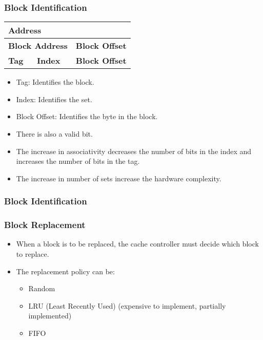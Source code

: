 \begin{frame}
    \frametitle{Block Identification}
    \begin{table}[h!]
        \centering
        \begin{tabular}{|p{5cm}|p{3cm}|p{3cm}|}
            \hline
            \multicolumn{3}{|p{11cm}|}{\textbf{Address}} \\
            \hline
            \multicolumn{2}{|p{8cm}|}{\textbf{Block Address}} & \multicolumn{1}{p{3cm}|}{\textbf{Block Offset}} \\
            \hline
            \multicolumn{1}{|p{5cm}|}{\textbf{Tag}} & \multicolumn{1}{|p{3cm}|}{\textbf{Index}} & \multicolumn{1}{p{3cm}|}{\textbf{Block Offset}} \\
            \hline
        \end{tabular}
    \end{table}
    \begin{itemize}
        \item Tag: Identifies the block.
        \item Index: Identifies the set.
        \item Block Offset: Identifies the byte in the block.
        \item There is also a valid bit.
        \item The increase in associativity decreases the number of bits in the index and increases the number of bits in the tag.
        \item The increase in number of sets increase the hardware complexity.
    \end{itemize}
\end{frame}


\begin{frame}
    \frametitle{Block Identification}
\end{frame}

\begin{frame}
    \frametitle{Block Replacement}
    \begin{itemize}
        \item When a block is to be replaced, the cache controller must decide which block to replace.
        \item The replacement policy can be:
        \begin{itemize}
            \item Random
            \item LRU (Least Recently Used) (expensive to implement, partially implemented)
            \item FIFO
        \end{itemize}
    \end{itemize}
\end{frame}

